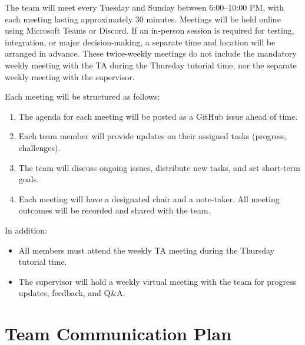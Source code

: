 \documentclass{article}
\begin{document}





The team will meet every Tuesday and Sunday between 6:00--10:00 PM, with each meeting lasting approximately 30 minutes. 
Meetings will be held online using Microsoft Teams or Discord. If an in-person session is required for testing, integration, or major 
decision-making, a separate time and location will be arranged in advance. These twice-weekly meetings do not include 
the mandatory weekly meeting with the TA during the Thursday tutorial time, nor the separate weekly meeting with the supervisor.

Each meeting will be structured as follows:

\begin{enumerate}
    \item The agenda for each meeting will be posted as a GitHub issue ahead of time.
    \item Each team member will provide updates on their assigned tasks (progress, challenges).
    \item The team will discuss ongoing issues, distribute new tasks, and set short-term goals.
    \item Each meeting will have a designated chair and a note-taker. All meeting outcomes will be recorded and shared with the team.
\end{enumerate}

In addition:
\begin{itemize}
    \item All members must attend the weekly TA meeting during the Thursday tutorial time.
    \item The supervisor will hold a weekly virtual meeting with the team for progress updates, feedback, and Q\&A.
\end{itemize}





\section{Team Communication Plan}
\end{document}
